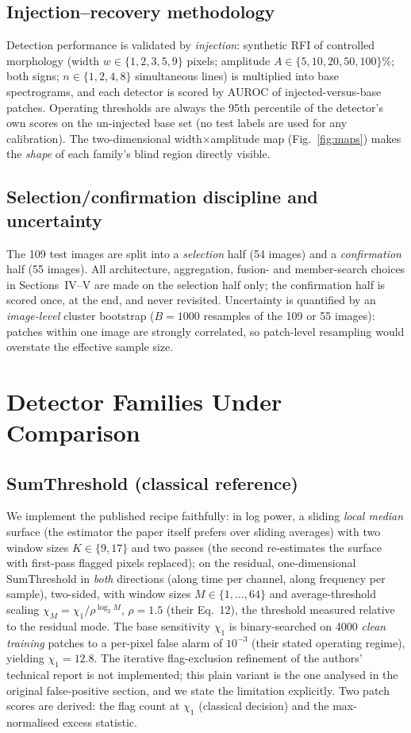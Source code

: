 \documentclass[journal]{IEEEtran}
\begin{document}
\subsection{Injection--recovery methodology}
Detection performance is validated by \emph{injection}: synthetic RFI of
controlled morphology (width $w\in\{1,2,3,5,9\}$ pixels; amplitude
$A\in\{5,10,20,50,100\}\%$; both signs; $n\in\{1,2,4,8\}$ simultaneous
lines) is multiplied into base spectrograms, and each detector is scored by
AUROC of injected-versus-base patches.  Operating thresholds are always the
95th percentile of the detector's own scores on the un-injected base set
(no test labels are used for any calibration).  The two-dimensional
width$\times$amplitude map (Fig.~\ref{fig:maps}) makes the \emph{shape} of
each family's blind region directly visible.

\subsection{Selection/confirmation discipline and uncertainty}
The 109 test images are split into a \emph{selection} half (54 images) and a
\emph{confirmation} half (55 images).  All architecture, aggregation, fusion-
and member-search choices in Sections~IV--V are made on the selection half
only; the confirmation half is scored once, at the end, and never revisited.
Uncertainty is quantified by an \emph{image-level} cluster bootstrap
($B=1000$ resamples of the 109 or 55 images): patches within one image are
strongly correlated, so patch-level resampling would overstate the effective
sample size.

\section{Detector Families Under Comparison}
\subsection{SumThreshold (classical reference)}
We implement the published recipe \cite{offringa2010} faithfully: in log
power, a sliding \emph{local median} surface (the estimator the paper itself
prefers over sliding averages) with two window sizes $K\in\{9,17\}$ and two
passes (the second re-estimates the surface with first-pass flagged pixels
replaced); on the residual, one-dimensional SumThreshold in \emph{both}
directions (along time per channel, along frequency per sample), two-sided,
with window sizes $M\in\{1,\dots,64\}$ and average-threshold scaling
$\chi_M=\chi_1/\rho^{\log_2 M}$, $\rho=1.5$ (their Eq.~12), the threshold
measured relative to the residual mode.  The base sensitivity $\chi_1$ is
binary-searched on 4000 \emph{clean training} patches to a per-pixel false
alarm of $10^{-3}$ (their stated operating regime), yielding
$\chi_1=12.8$.  The iterative flag-exclusion refinement of the authors'
technical report \cite{offringa2013} is not implemented; this plain variant
is the one analysed in the original false-positive section, and we state the
limitation explicitly.  Two patch scores are derived: the flag count at
$\chi_1$ (classical decision) and the max-normalised excess statistic.
\end{document}

